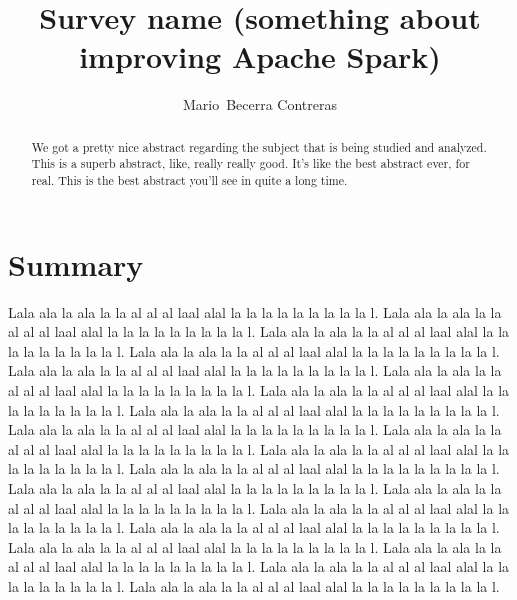 \documentclass{article}
\begin{document}

\title{Survey name (something about improving Apache Spark)}

\author{Mario~Becerra Contreras}


\maketitle

\begin{abstract}

We got a pretty nice abstract regarding the subject that is being studied and analyzed. This is a superb abstract, like, really really good. It's like the best abstract ever, for real. This is the best abstract you'll see in quite a long time.

\end{abstract}

\section{Summary}

Lala ala la ala la la al al al laal alal la la la la la la la la la l. Lala ala la ala la la al al al laal alal la la la la la la la la la l. Lala ala la ala la la al al al laal alal la la la la la la la la la l. Lala ala la ala la la al al al laal alal la la la la la la la la la l. Lala ala la ala la la al al al laal alal la la la la la la la la la l. Lala ala la ala la la al al al laal alal la la la la la la la la la l. Lala ala la ala la la al al al laal alal la la la la la la la la la l. Lala ala la ala la la al al al laal alal la la la la la la la la la l. Lala ala la ala la la al al al laal alal la la la la la la la la la l. Lala ala la ala la la al al al laal alal la la la la la la la la la l. Lala ala la ala la la al al al laal alal la la la la la la la la la l. Lala ala la ala la la al al al laal alal la la la la la la la la la l. Lala ala la ala la la al al al laal alal la la la la la la la la la l. Lala ala la ala la la al al al laal alal la la la la la la la la la l. Lala ala la ala la la al al al laal alal la la la la la la la la la l. Lala ala la ala la la al al al laal alal la la la la la la la la la l. Lala ala la ala la la al al al laal alal la la la la la la la la la l. Lala ala la ala la la al al al laal alal la la la la la la la la la l. Lala ala la ala la la al al al laal alal la la la la la la la la la l. Lala ala la ala la la al al al laal alal la la la la la la la la la l. 
\end{document}
